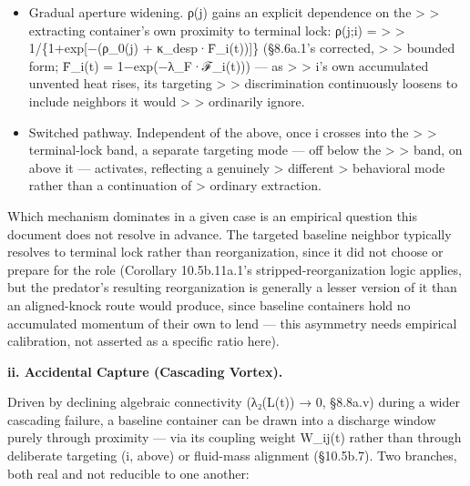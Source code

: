 \documentclass[
]{article}
\begin{document}
\begin{itemize}
\item
  Gradual aperture widening. ρ(j) gains an explicit dependence on the
  \textgreater{} \textgreater{} extracting container's own proximity to
  terminal lock: ρ(j;i) = \textgreater{} \textgreater{}
  1/\{1+exp{[}−(ρ\_0(j) + κ\_desp·F̄\_i(t)){]}\} (§8.6a.1's corrected,
  \textgreater{} \textgreater{} bounded form; F̄\_i(t) =
  1−exp(−λ\_F·ℱ\_i(t))) --- as \textgreater{} \textgreater{} i's own
  accumulated unvented heat rises, its targeting \textgreater{}
  \textgreater{} discrimination continuously loosens to include
  neighbors it would \textgreater{} \textgreater{} ordinarily ignore.
\item
  Switched pathway. Independent of the above, once i crosses into the
  \textgreater{} \textgreater{} terminal-lock band, a separate targeting
  mode --- off below the \textgreater{} \textgreater{} band, on above it
  --- activates, reflecting a genuinely \textgreater{} different
  \textgreater{} behavioral mode rather than a continuation of
  \textgreater{} ordinary extraction.
\end{itemize}

Which mechanism dominates in a given case is an empirical question this
document does not resolve in advance. The targeted baseline neighbor
typically resolves to terminal lock rather than reorganization, since it
did not choose or prepare for the role (Corollary 10.5b.11a.1's
stripped-reorganization logic applies, but the predator's resulting
reorganization is generally a lesser version of it than an aligned-knock
route would produce, since baseline containers hold no accumulated
momentum of their own to lend --- this asymmetry needs empirical
calibration, not asserted as a specific ratio here).

\textbf{ii. Accidental Capture (Cascading Vortex).}

Driven by declining algebraic connectivity (λ₂(L(t)) → 0, §8.8a.v)
during a wider cascading failure, a baseline container can be drawn into
a discharge window purely through proximity --- via its coupling weight
W\_ij(t) rather than through deliberate targeting (i, above) or
fluid-mass alignment (§10.5b.7). Two branches, both real and not
reducible to one another:
\end{document}
